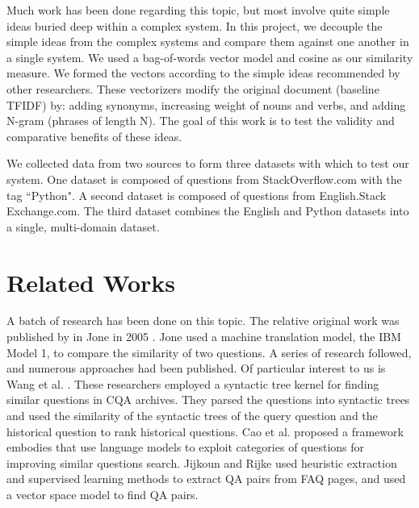 \documentclass{acm_proc_article-sp}
\begin{document}
Much work has been done regarding this topic, but most involve quite simple ideas buried deep within a complex system. In this project, we decouple the simple ideas from the complex systems and compare them against one another in a single system. We used a bag-of-words vector model and cosine as our similarity measure. We formed the vectors according to the simple ideas recommended by other researchers. These vectorizers modify the original document (baseline TFIDF) by: adding synonyms, increasing weight of nouns and verbs, and adding N-gram (phrases of length N). The goal of this work is to test the validity and comparative benefits of these ideas.

We collected data from two sources to form three datasets with which to test our system. One dataset is composed of questions from StackOverflow.com with the tag ``Python". A second dataset is composed of questions from English.Stack
Exchange.com. 
The third dataset combines the English and Python datasets into a single, multi-domain dataset.


\section{Related Works}
A batch of research has been done on this topic. The relative original work was published by  in Jone in 2005 \cite{jeon2005finding}. Jone used a machine translation model, the IBM Model 1, to compare the similarity of two questions.  A series of research followed, and numerous approaches had been published. 
Of particular interest to us is Wang et al. \cite{wang2009syntactic}. These researchers employed a syntactic tree kernel for finding similar questions in CQA archives. They parsed the questions into syntactic trees and used the similarity of the syntactic trees of the query question and the historical question to rank historical questions. 
Cao et al. \cite{cao2009use} proposed a framework embodies that use language models to exploit categories of questions for improving similar questions  search.   
Jijkoun and Rijke \cite{jijkoun2005retrieving} used heuristic extraction and supervised learning methods to extract QA pairs from FAQ pages, and used a vector space model to find QA pairs.  
\end{document}
